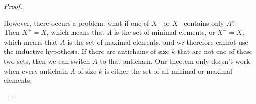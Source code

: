 \documentclass[a4paper]{article}
\begin{document}
\begin{proof}
\begin{description}
			However, there occurs a problem: what if one of \( X^+ \) or \( X^- \) contains only \( A \)? Then \( X^+=X \), which means that \( A \) is the set of minimal elements, or \( X^-=X \), which means that \( A  \) is the set of maximal elements, and we therefore cannot use the inductive hypothesis. If there are antichains of size \( k \) that are not one of these two sets, then we can switch \( A \) to that antichain. Our theorem only doesn't work when every antichain \( A \) of size \( k \) is either the set of all minimal or maximal elements.
\end{description}
\end{proof}
\end{document}
